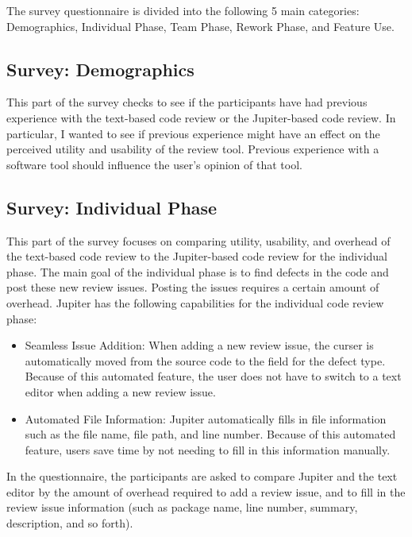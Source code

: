 The survey questionnaire is divided into the following 5 main categories: Demographics, Individual Phase, Team Phase, Rework Phase, and Feature Use.

\subsection{Survey: Demographics}
\label{subsec:survey:-demographics}

This part of the survey checks to see if the participants have had previous experience with the text-based code review or the Jupiter-based code review. In particular, I wanted to see if previous experience might have an effect on the perceived utility and usability of the review tool. Previous experience with a software tool should influence the user's opinion of that tool.

\subsection{Survey: Individual Phase}
\label{subsec:survey:-individual-phase}

This part of the survey focuses on comparing utility, usability, and overhead of the text-based code review to the Jupiter-based code review for the individual phase. The main goal of the individual phase is to find defects in the code and post these new review issues. Posting the issues requires a certain amount of overhead. Jupiter has the following capabilities for the individual code review phase:

\begin{itemize}
	\item Seamless Issue Addition: When adding a new review issue, the curser is automatically moved from the source code to the field for the defect type. Because of this automated feature, the user does not have to switch to a text editor when adding a new review issue.
	\item Automated File Information: Jupiter automatically fills in file information such as the file name, file path, and line number. Because of this automated feature, users save time by not needing to fill in this information manually.
\end{itemize}

In the questionnaire, the participants are asked to compare Jupiter and the text editor by the amount of overhead required to add a review issue, and to fill in the review issue information (such as package name, line number, summary, description, and so forth).

